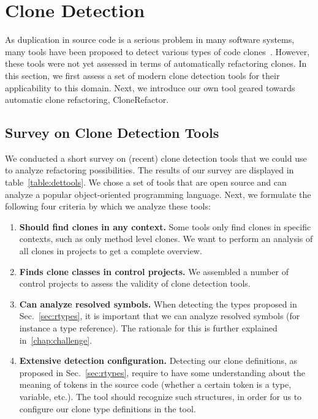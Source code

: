 \documentclass[a4paper]{article}
\begin{document}
\section{Clone Detection}\label{chap:clonedetection}
As duplication in source code is a serious problem in many software systems, many tools have been proposed to detect various types of code clones~\cite{sheneamer2016survey, svajlenko2014evaluating}. However, these tools were not yet assessed in terms of automatically refactoring clones. In this section, we first assess a set of modern clone detection tools for their applicability to this domain. Next, we introduce our own tool geared towards automatic clone refactoring, CloneRefactor.%

\subsection{Survey on Clone Detection Tools}
\label{ch:tool-overview}
We conducted a short survey on (recent) clone detection tools that we could use to analyze refactoring possibilities. The results of our survey are displayed in table~\ref{table:dettools}. We chose a set of tools that are open source and can analyze a popular object-oriented programming language. Next, we formulate the following four criteria by which we analyze these tools:
\begin{enumerate}
    \item \textbf{Should find clones in any context.} Some tools only find clones in specific contexts, such as only method level clones. We want to perform an analysis of all clones in projects to get a complete overview.
\item \textbf{Finds clone classes in control projects.} We assembled a number of control projects to assess the validity of clone detection tools.
\item \textbf{Can analyze resolved symbols.} When detecting the types proposed in Sec.~\ref{sec:rtypes}, it is important that we can analyze resolved symbols (for instance a type reference). The rationale for this is further explained in~\ref{chap:challenge}.
\item \textbf{Extensive detection configuration.} Detecting our clone definitions, as proposed in Sec.~\ref{sec:rtypes}, require to have some understanding about the meaning of tokens in the source code (whether a certain token is a type, variable, etc.). The tool should recognize such structures, in order for us to configure our clone type definitions in the tool.
\end{enumerate}
\end{document}

